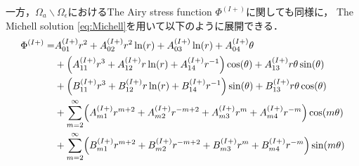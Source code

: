一方，$\Omega_{a}\backslash\Omega_\epsilon$におけるThe Airy stress function $\Phi^{(I+)}$に関しても同様に，
The Michell solution \eqref{eq:Michell}を用いて以下のように展開できる．
\begin{align}
\Phi^{(I+)} =&A_{01}^{(I+)}r^2+A_{02}^{(I+)}r^2\ln(r)+A_{03}^{(I+)}\ln(r)+A_{04}^{(I+)}\theta
\nonumber
\\
&+\Bigl(A_{11}^{(I+)}r^3+A_{12}^{(I+)}r\ln(r)+A_{14}^{(I+)}r^{-1}\Bigr)\cos(\theta)+A_{13}^{(I+)}r\theta \sin(\theta)
\nonumber
\\
&+\Bigl(B_{11}^{(I+)}r^3+B_{12}^{(I+)}r\ln(r)+B_{14}^{(I+)}r^{-1}\Bigr)\sin(\theta)+B_{13}^{(I+)}r\theta \cos(\theta)
\nonumber
\\
&+\sum_{m=2}^{\infty}\Bigl(A_{m1}^{(I+)}r^{m+2}+A_{m2}^{(I+)}r^{-m+2}
+A_{m3}^{(I+)}r^{m}+A_{m4}^{(I+)}r^{-m}\Bigr)\cos(m\theta)
\nonumber
\\
&+\sum_{m=2}^{\infty}\Bigl(B_{m1}^{(I+)}r^{m+2}+B_{m2}^{(I+)}r^{-m+2}
+B_{m3}^{(I+)}r^{m}+B_{m4}^{(I+)}r^{-m}\Bigr)\sin(m\theta)
\label{eq:AiryOut1}
\end{align}

